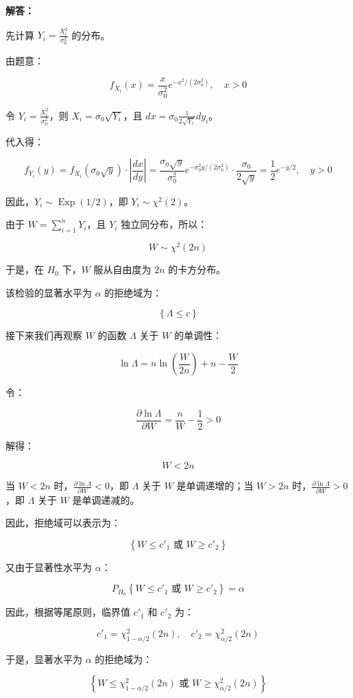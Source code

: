 \documentclass[12pt,a4paper]{article}
\begin{document}
\begin{answerbox}
\textbf{解答：}

先计算 $Y_i = \frac{X_i^2}{\sigma_0^2}$ 的分布。

由题意：

$$
f_{X_i}(x) = \frac{x}{\sigma_0^2} e^{-x^2/(2\sigma_0^2)}, \quad x > 0
$$

令 $Y_i = \frac{X_i^2}{\sigma_0^2}$，则 $X_i = \sigma_0 \sqrt{Y_i}$，且 $dx = \sigma_0 \frac{1}{2\sqrt{Y_i}} dy_i$。

代入得：

$$
f_{Y_i}(y) = f_{X_i}(\sigma_0 \sqrt{y}) \cdot \left|\frac{dx}{dy}\right| = \frac{\sigma_0 \sqrt{y}}{\sigma_0^2} e^{-\sigma_0^2 y/(2\sigma_0^2)} \cdot \frac{\sigma_0}{2\sqrt{y}} = \frac{1}{2} e^{-y/2}, \quad y > 0
$$

因此，$Y_i \sim \operatorname{Exp}(1/2)$，即 $Y_i \sim \chi^2(2)$。

由于 $W = \sum_{i=1}^n Y_i$，且 $Y_i$ 独立同分布，所以：

$$
W \sim \chi^2(2n)
$$

于是，在 $H_0$ 下，$W$ 服从自由度为 $2n$ 的卡方分布。

该检验的显著水平为 $\alpha$ 的拒绝域为：

$$
\left\{\Lambda \leq c\right\}
$$

接下来我们再观察 $W$ 的函数 $\Lambda$ 关于 $W$ 的单调性：

$$
\ln \Lambda = n \ln \left(\frac{W}{2n}\right) + n - \frac{W}{2}
$$

令：

$$
\frac{\partial \ln \Lambda}{\partial W} = \frac{n}{W} - \frac{1}{2} > 0
$$

解得：

$$
W < 2n
$$

当 $W < 2n$ 时，$\frac{\partial \ln \Lambda}{\partial W} < 0$，即 $\Lambda$ 关于 $W$ 是单调递增的；当 $W > 2n$ 时，$\frac{\partial \ln \Lambda}{\partial W} > 0$，即 $\Lambda$ 关于 $W$ 是单调递减的。

因此，拒绝域可以表示为：

$$
\left\{W \leq c'_1 \text{ 或 } W \geq c'_2\right\}
$$

又由于显著性水平为 $\alpha$：

$$
P_{H_0}\left\{W \leq c'_1 \text{ 或 } W \geq c'_2\right\} = \alpha
$$

因此，根据等尾原则，临界值 $c'_1$ 和 $c'_2$ 为：

$$
c'_1 = \chi^2_{1-\alpha/2}(2n), \quad c'_2 = \chi^2_{\alpha/2}(2n)
$$

于是，显著水平为 $\alpha$ 的拒绝域为：

$$
\left\{W \leq \chi^2_{1-\alpha/2}(2n) \text{ 或 } W \geq \chi^2_{\alpha/2}(2n)\right\}
$$

\end{answerbox}
\end{document}
